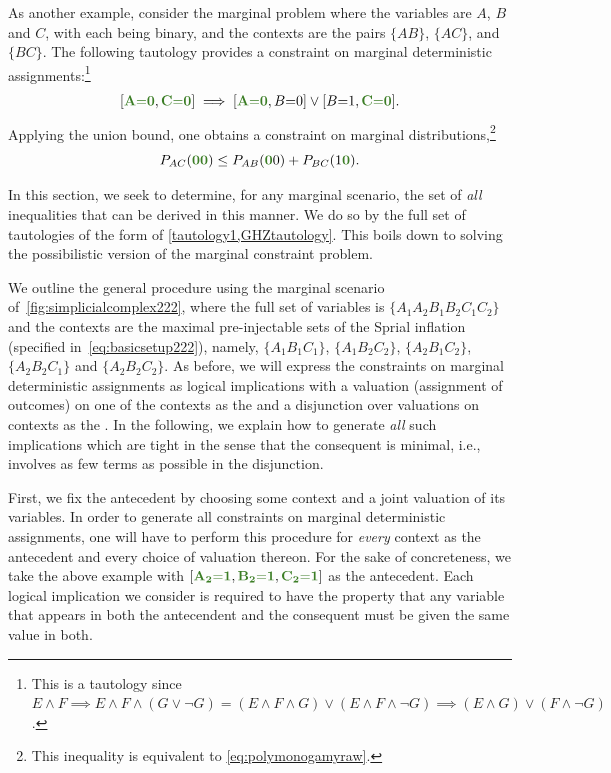 \documentclass[aps,english,superscriptaddress,onecolumn,twoside,longbibliography,pra,floatfix,fleqn,nofootinbib]{revtex4-1}%
\newcommand*{\mgreen}[1]{{\color{OliveGreen}{\mathbf{#1}}}}
\newcommand*{\tblue}[1]{{\color{MidnightBlue}{\textbf{#1}}}}
\theoremstyle{definition}
\newcounter{example}[section]
\newcommand{\cramp}[1]{\ensuremath{\mathord{#1}}}
\newcommand{\eql}{\cramp{=}}
\DeclarePairedDelimiter{\bracks}{\lbrack}{\rbrack}
\begin{document}
As another example, consider the marginal problem where the variables are $A$, $B$ and $C$, with each being binary, and the contexts are the pairs $\{AB\}$, $\{AC\}$, and $\{BC\}$.  
The following tautology provides a constraint on marginal deterministic assignments:\footnote{This is a tautology since $E \land F  \implies  E \land F \land (G \lor \lnot G) = (E \land F \land G) \lor (E\land F \land \lnot G) \implies (E \land G) \lor (F \land \lnot G)$.}
\begin{align}\label{GHZtautology}
 \bracks{\mgreen{A \eql 0}, \mgreen{C \eql 0}} \implies \bracks{\mgreen{A \eql 0}, B \eql 0} \lor \bracks{B \eql 1, \mgreen{C \eql 0}}.
\end{align}
Applying the union bound, one obtains a constraint on marginal distributions,\footnote{This inequality is equivalent to \cref{eq:polymonogamyraw}.}
\[
P_{AC}(\mgreen{0 0}) \leq P_{AB}(\mgreen{0} 0) + P_{BC}(1 \mgreen{0}).
\]

In this section, we seek to determine, for any marginal scenario, the set of \emph{all} inequalities that can be derived in this manner.  We do so by \tblue{enumerating} the full set of tautologies of the form of \cref{tautology1,GHZtautology}. This boils down to solving the possibilistic version of the marginal constraint problem.

We outline the general procedure using the marginal scenario of~\cref{fig:simplicialcomplex222}, where the full set of variables is $\{ A_1 A_2 B_1 B_2 C_1 C_2\}$ and the contexts are the maximal pre-injectable sets of the Sprial inflation  (specified in~\cref{eq:basicsetup222}), namely, $\{A_1 B_1 C_1\}$, $\{A_1 B_2 C_2\}$, $\{A_2 B_1 C_2\}$, $\{A_2 B_2 C_1\}$ and $\{A_2 B_2 C_2\}$.  As before, we will express the constraints on marginal deterministic assignments as logical implications with
a valuation (assignment of outcomes) on one of the contexts as the \tblue{antecedent} and a disjunction over valuations on contexts as the \tblue{consequent}. In the following, we explain how to generate \emph{all} such implications which are tight in the sense that the consequent is minimal, i.e., involves as few terms as possible in the disjunction. 

First, we fix the antecedent by choosing some context and a joint valuation of its variables. In order to generate all constraints on marginal deterministic assignments, one will have to perform this procedure for \emph{every} context as the antecedent and every choice of valuation thereon. For the sake of concreteness, we take the above example with $\bracks{\mgreen{A_2 \eql 1}, \mgreen{B_2 \eql 1}, \mgreen{C_2 \eql 1}}$ as the antecedent.  
Each logical implication we consider is required to have the property that any variable that appears in both the antecendent and the consequent must be given the same value in both. 
\end{document}
